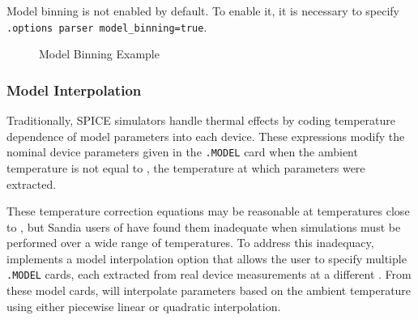 Model binning is not enabled by default.  To enable it, it is necessary to 
specify \texttt{.options parser model\_binning=true}.

\begin{figure}[htbp]
  \begin{centering}
\caption[Model Binning Example]
{Model Binning Example\label{binningExample} }
\end{centering}
\end{figure}

\subsubsection{Model Interpolation}
\label{Model_Interpolation}

Traditionally, SPICE simulators handle thermal effects by coding temperature
dependence of model parameters into each device.  These expressions modify the
nominal device parameters given in the \texttt{.MODEL} card when the ambient
temperature is not equal to , the temperature at which parameters
were extracted.

These temperature correction equations may be reasonable at temperatures close
to , but Sandia users of \Xyce{} have found them inadequate when
simulations must be performed over a wide range of temperatures.  To address
this inadequacy, \Xyce{} implements a model interpolation option that allows
the user to specify multiple \texttt{.MODEL} cards, each extracted from real
device measurements at a different .  From these model cards,
\Xyce{} will interpolate parameters based on the ambient temperature using
either piecewise linear or quadratic interpolation.

